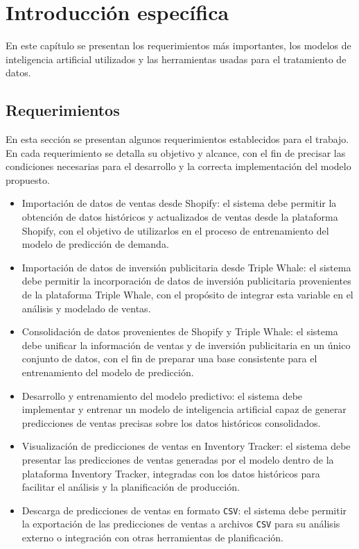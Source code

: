 \chapter{Introducción específica} %

\label{Chapter2}

En este capítulo se presentan los requerimientos más importantes, los modelos de inteligencia artificial utilizados y las herramientas usadas para el tratamiento de datos.

\section{Requerimientos}

En esta sección se presentan algunos requerimientos establecidos para el trabajo. En cada requerimiento se detalla su objetivo y alcance, con el fin de precisar las condiciones necesarias para el desarrollo y la correcta implementación del modelo propuesto.


	\begin{itemize}
		\item Importación de datos de ventas desde Shopify: el sistema debe permitir la obtención de datos históricos y actualizados de ventas desde la plataforma Shopify, con el objetivo de utilizarlos en el proceso de entrenamiento del modelo de predicción de demanda.
		\item Importación de datos de inversión publicitaria desde Triple Whale: el sistema debe permitir la incorporación de datos de inversión publicitaria provenientes de la plataforma Triple Whale, con el propósito de integrar esta variable en el análisis y modelado de ventas.
		\item Consolidación de datos provenientes de Shopify y Triple Whale: el sistema debe unificar la información de ventas y de inversión publicitaria en un único conjunto de datos, con el fin de preparar una base consistente para el entrenamiento del modelo de predicción.
		\item Desarrollo y entrenamiento del modelo predictivo: el sistema debe implementar y entrenar un modelo de inteligencia artificial capaz de generar predicciones de ventas precisas sobre los datos históricos consolidados.
		\item Visualización de predicciones de ventas en Inventory Tracker: el sistema debe presentar las predicciones de ventas generadas por el modelo dentro de la plataforma Inventory Tracker, integradas con los datos históricos para facilitar el análisis y la planificación de producción.
		\item Descarga de predicciones de ventas en formato \texttt{CSV}: el sistema debe permitir la exportación de las predicciones de ventas a archivos \texttt{CSV} para su análisis externo o integración con otras herramientas de planificación.
	\end{itemize}




